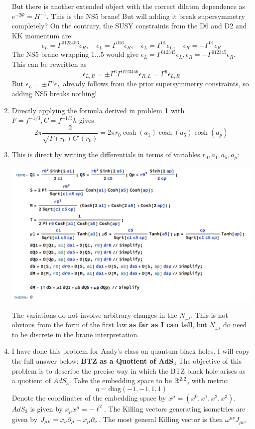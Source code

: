 \documentclass[11pt, class=article, crop=false]{standalone}
\begin{document}
\begin{enumerate}
	But there is another extended object with the correct dilaton dependence as $e^{-2\Phi} = H^{-1}$. This is the NS5 brane! But will adding it break supersymmetry completely? On the contrary, the SUSY constraints from the D6 and D2 and KK momentum are:
	\[
		\epsilon_L = \Gamma^{0 12345 6} \epsilon_R, \quad \epsilon_L = \Gamma^{016} \epsilon_R, \quad \epsilon_L = \Gamma^{01} \epsilon_L, \quad  \epsilon_R = -\Gamma^{01} \epsilon_R
	\]
	The NS5 brane wrapping $1 \dots 5$ would give $\epsilon_L = \Gamma^{0 12345} \epsilon_L, \epsilon_R = - \Gamma^{012345} \epsilon_R$. This can be rewritten as
	\[
		\epsilon_{L,R} = \pm \Gamma^6 \Gamma^{0123456} \epsilon_{R,L} = \Gamma^6 \epsilon_{L,R}
	\]
	But $\epsilon_L = \pm \Gamma^6 \epsilon_L$ already follows from the prior supersymmetry constraints, so adding NS5 breaks nothing! 
	
	\item Directly applying the formula derived in problem \textbf{1} with $F=f^{-1/3}, C= f^{-1/3} h$ gives
	\[
		2\pi \frac{2}{\sqrt{F(r_0)} C'(r_0)} = 2 \pi r_0 \cosh(a_1) \cosh(a_5) \cosh(a_p) 
	\]
	
	\item This is direct by writing the differentials in terms of variables $r_0, a_1, a_5, a_p$:
	\begin{center}
		\includegraphics[scale=0.5]{"Figures/5D BH 1st Law"}
	\end{center}
	The variations do not involve arbitrary changes in the $N_{\pm i}$. This is not obvious from the form of the first law \textbf{as far as I can tell}, but $N_{\pm i}$ do need to be discrete in the brane interpretation.
	
	\item I have done this problem for Andy's class on quantum black holes. I will copy the full answer below: 
	\textbf{BTZ as a Quotient of AdS$_3$}
	The objective of this problem is to describe the precise way in which the BTZ black hole arises as a quotient of $AdS_3$. Take the embedding space to be $\mathbb{R}^{2,2}$, with metric:
	\[
		\eta = \text{diag}(-1, -1, 1, 1)
	\]
	Denote the coordinates of the embedding space by $x^\mu =(x^0, x^1, x^2,x^3)$. $AdS_3$ is given by $x_\mu x^\mu = -\ell^2$. The Killing vectors generating isometries are given by $J_{\mu \nu} = x_{\nu} \partial_\mu - x_\mu \partial_\nu$. The most general Killing vector is then $\omega^{\mu \nu} J_{\mu \nu}$. 
	

\end{enumerate}
\end{document}
